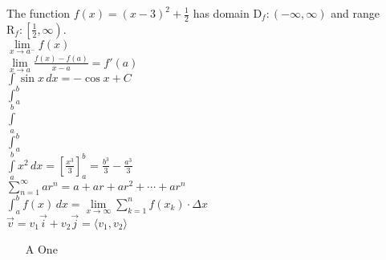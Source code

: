 \documentclass[11pt]{article}
\begin{document}
The function $f(x)=(x-3)^2+\frac{1}{2}$ has domain $\mathrm{D}_f:(-\infty,\infty)$ and range $\mathrm{R}_f:\left[\frac{1}{2},\infty\right)$.\\

$\lim \limits_{x \to a^-} f(x)$\\

$\displaystyle{\lim \limits_{x \to a} \frac{f(x)-f(a)}{x-a}=f'(a)}$\\

$\displaystyle{\int \sin x \,dx=-\cos x + C}$\\

$\int_a^b$\\

$\int \limits_a^b$\\

$\displaystyle{\int_a^b}$\\

$\displaystyle{\int \limits_{a}^{b}x^2 \,dx=\left[\frac{x^3}{3}\right]_{a}^{b}=\frac{b^3}{3}-\frac{a^3}{3}}$\\

$\displaystyle{\sum \limits_{n=1}^{\infty}ar^n=a+ar+ar^2+ \cdots +ar^n}$\\

$\displaystyle{\int_a^b f(x) \,dx=\lim \limits_{x \to \infty} \sum \limits_{k=1}^{n} f(x_k) \cdot \Delta x}$\\

$\vec{v}=v_1 \vec{i}+v_2 \vec{j}=\langle v_1, v_2 \rangle$

\begin{enumerate}
    \item[A] One
\end{enumerate}
\end{document}
